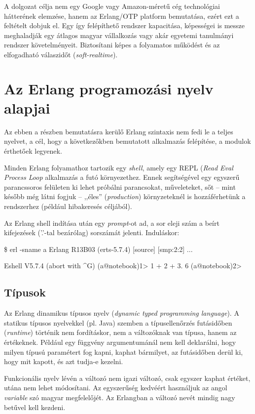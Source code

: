 \documentclass[12pt, a4paper, oneside]{book}
\begin{document}
A dolgozat célja nem egy Google vagy Amazon-méretű cég technológiai hátterének
elemzése, hanem az Erlang/OTP platform bemutatása, ezért ezt a feltételt dobjuk
el. Egy így felépíthető rendszer kapacitása, képességei is messze meghaladják
egy átlagos magyar vállalkozás vagy akár egyetemi tanulmányi rendszer
követelményeit. Biztosítani képes a folyamatos működést és az elfogadható
válaszidőt (\emph{soft-realtime}).

\section{Az Erlang programozási nyelv alapjai} 
Az ebben a részben bemutatásra kerülő Erlang szintaxis nem fedi le a teljes
nyelvet, a cél, hogy a következőkben bemutatott alkalmazás felépítése, a
modulok érthetőek legyenek.

Minden Erlang folyamathoz tartozik egy \emph{shell}, amely egy REPL (\emph{Read
Eval Process Loop} alkalmazás a futó környezethez. Ennek segítségével egy
egyszerű parancssoros felületen ki lehet próbálni parancsokat, műveleteket, sőt
-- mint később még látni fogjuk -- ,,éles'' (\emph{production}) környzeteknél
is hozzáférhetünk a rendszerhez (például hibakeresés céljából).

Az Erlang shell indítása után egy \emph{prompt}-ot ad, a sor eleji szám a
beírt kifejezések ('.'-tal bezárólag) sorszámát jelenti. Induláskor:

\begin{code}{}{}
\$ erl -sname a
Erlang R13B03 (erts-5.7.4) [source] [smp:2:2] ...

Eshell V5.7.4  (abort with ^G)
(a@notebook)1> 1 + 2 + 3.
6
(a@notebook)2>
\end{code}

\subsection{Típusok} Az Erlang dinamikus típusos nyelv (\emph{dynamic typed
programming language}).  A statikus típusos nyelvekkel (pl. Java) szemben a
típusellenőrzés futásidőben (\emph{runtime}) történik nem fordításkor, nem a
változóknak van típusa, hanem az értékeknek.  Például egy függvény
argumentumánál nem kell deklarálni, hogy milyen típusú paramétert fog kapni,
kaphat bármilyet, az futásidőben derül ki, hogy mit kapott, és azt tudja-e
kezelni. 

Funkcionális nyelv lévén a változó nem igazi változó, csak egyszer kaphat
értéket, utána nem lehet módosítani. Az egyszerűség kedvéért használjuk az
angol \emph{variable} szó magyar megfelelőjét. Az Erlangban a változó nevét
mindig nagy betűvel kell kezdeni.
\end{document}
